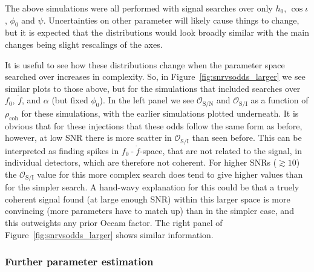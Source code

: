The above simulations were all performed with signal searches over only $h_0$, $\cos{\iota}$, $\phi_0$ and $\psi$. Uncertainties on other parameter will
likely cause things to change, but it is expected that the distributions would look broadly similar with the main changes being slight rescalings of the axes.

It is useful to see how these distributions change when the parameter space searched over increases in complexity. So, in Figure~\ref{fig:snrvsodds_larger}
we see similar plots to those above, but for the simulations that included searches over $f_0$, $\dot{f}$, and $\alpha$ (but fixed $\phi_0$). In the left
panel we see $\mathcal{O}_{\text{S}/\text{N}}$ and $\mathcal{O}_{\text{S}/\text{I}}$ as a function of $\rho_{\text{coh}}$ for these simulations, with the
earlier simulations plotted underneath. It is obvious that for these injections that these odds follow the same form as before, however, at low SNR there
is more scatter in $\mathcal{O}_{\text{S}/\text{I}}$ than seen before. This can be interpreted as finding spikes in $f_0\operatorname{-}\dot{f}$-space, that
are not related to the signal, in individual detectors, which are therefore not coherent. For higher SNRs ($\gtrsim 10$) the $\mathcal{O}_{\text{S}/\text{I}}$
value for
this more complex search does tend to give higher values than for the simpler search. A hand-wavy explanation for this could be that a truely coherent signal
found (at large enough SNR) within this larger space is more convincing (more parameters have to match up) than in the simpler case, and this outweights any
prior Occam factor. The right panel of Figure~\ref{fig:snrvsodds_larger} shows similar information.

\subsubsection{Further parameter estimation}

